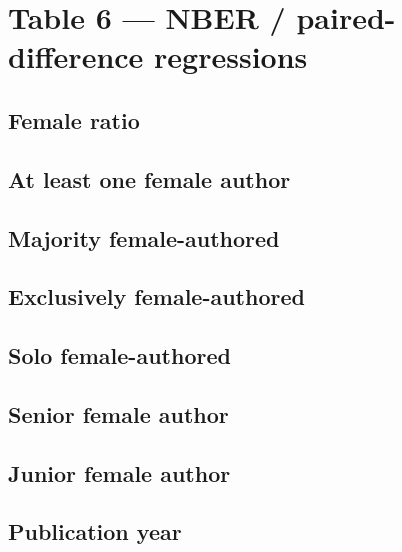 \documentclass[12pt]{article}
\begin{document}
\section{Table 6 --- NBER / paired-difference regressions}

\subsection{Female ratio}

\clearpage

\subsection{At least one female author}

\clearpage

\subsection{Majority female-authored}

\clearpage

\subsection{Exclusively female-authored}

\clearpage

\subsection{Solo female-authored}

\clearpage

\subsection{Senior female author}

\clearpage

\subsection{Junior female author}

\clearpage

\subsection{Publication year}

\clearpage
\end{document}
